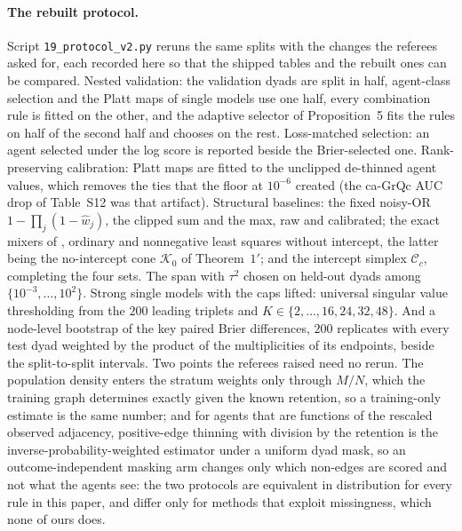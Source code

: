 \documentclass[12pt]{article}
\newcommand{\calC}{\mathcal{C}}
\newcommand{\calK}{\mathcal{K}}
\begin{document}
\paragraph{The rebuilt protocol.}
Script \texttt{19\_protocol\_v2.py} reruns the same splits with the changes the referees asked for, each recorded here so that the shipped tables and the rebuilt ones can be compared. Nested validation: the validation dyads are split in half, agent-class selection and the Platt maps of single models use one half, every combination rule is fitted on the other, and the adaptive selector of Proposition~5 fits the rules on half of the second half and chooses on the rest. Loss-matched selection: an agent selected under the log score is reported beside the Brier-selected one. Rank-preserving calibration: Platt maps are fitted to the unclipped de-thinned agent values, which removes the ties that the floor at $10^{-6}$ created (the ca-GrQc AUC drop of Table~S12 was that artifact). Structural baselines: the fixed noisy-OR $1-\prod_j(1-\hat w_j)$, the clipped sum and the max, raw and calibrated; the exact mixers of \citet{LiLe2024}, ordinary and nonnegative least squares without intercept, the latter being the no-intercept cone $\calK_0$ of Theorem~$1'$; and the intercept simplex $\calC_c$, completing the four sets. The span with $\tau^2$ chosen on held-out dyads among $\{10^{-3},\dots,10^2\}$. Strong single models with the caps lifted: universal singular value thresholding from the $200$ leading triplets and $K\in\{2,\dots,16,24,32,48\}$. And a node-level bootstrap of the key paired Brier differences, $200$ replicates with every test dyad weighted by the product of the multiplicities of its endpoints, beside the split-to-split intervals. Two points the referees raised need no rerun. The population density enters the stratum weights only through $M/N$, which the training graph determines exactly given the known retention, so a training-only estimate is the same number; and for agents that are functions of the rescaled observed adjacency, positive-edge thinning with division by the retention is the inverse-probability-weighted estimator under a uniform dyad mask, so an outcome-independent masking arm changes only which non-edges are scored and not what the agents see: the two protocols are equivalent in distribution for every rule in this paper, and differ only for methods that exploit missingness, which none of ours does.
\end{document}
